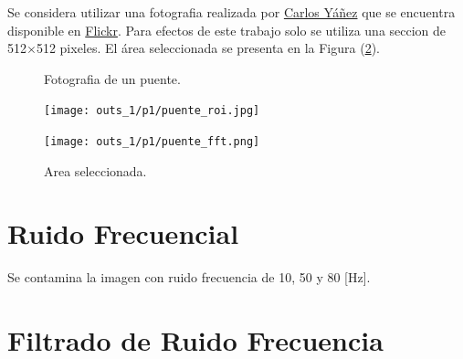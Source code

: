 \documentclass[
  letterpaper,
  twocolumn,
  9pt,
  journal,
  final]{IEEEtran}
\begin{document}
Se considera utilizar una fotografia realizada por \href{https://www.flickr.com/photos/carlosyanez/}{Carlos Yáñez} que se encuentra disponible en \href{https://www.flickr.com/photos/carlosyanez/29061122837/}{Flickr}. Para efectos de este trabajo solo se utiliza una seccion de 512$\times$512 pixeles. El área seleccionada se presenta en la Figura (\ref{fig:roi_fft}).

\begin{figure}[!tbh]
  \begin{center}
  \end{center}
  \caption{Fotografia de un puente.} \label{fig:original}
\end{figure}

\begin{figure}[!tbh]
  \centering
  \begin{minipage}[b]{0.49\columnwidth}
    \texttt{[image: outs\_1/p1/puente\_roi.jpg]}
  \end{minipage}
  \begin{minipage}[b]{0.49\columnwidth}
    \texttt{[image: outs\_1/p1/puente\_fft.png]}
  \end{minipage}
  \caption{Area seleccionada.} \label{fig:roi_fft}
\end{figure}


\section{Ruido Frecuencial}

Se contamina la imagen con ruido frecuencia de 10, 50 y 80 [Hz].


\section{Filtrado de Ruido Frecuencia}
\end{document}
